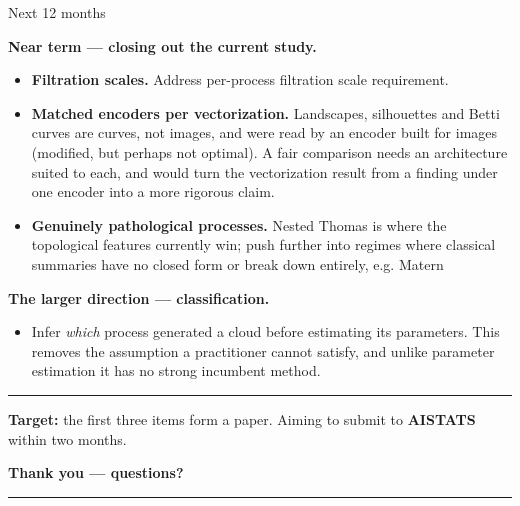 \documentclass[aspectratio=169,10pt]{beamer}
\begin{document}
\begin{frame}{Next 12 months}
\vspace{2pt}
{\footnotesize
\textbf{Near term --- closing out the current study.}
\begin{itemize}\setlength\itemsep{3pt}
  \item \textbf{Filtration scales.} Address per-process filtration scale requirement.
  \item \textbf{Matched encoders per vectorization.} Landscapes, silhouettes and
        Betti curves are curves, not images, and were read by an encoder built
        for images (modified, but perhaps not optimal). A fair comparison needs an architecture suited to each, and
        would turn the vectorization result from a finding under one encoder
        into a more rigorous claim.
  \item \textbf{Genuinely pathological processes.} Nested Thomas is where the
        topological features currently win; push further into regimes where
        classical summaries have no closed form or break down entirely, e.g. Matern
\end{itemize}
\vspace{5pt}
\textbf{The larger direction --- classification.}
\begin{itemize}\setlength\itemsep{3pt}
  \item Infer \emph{which} process generated a cloud before estimating its
        parameters. This removes the assumption a practitioner cannot satisfy,
        and unlike parameter estimation it has no strong incumbent method.
\end{itemize}}
\vspace{6pt}
\hrule
\vspace{4pt}
{\footnotesize
\textbf{Target:} the first three items form a paper. Aiming to submit to
\textbf{AISTATS} within two months.}
\end{frame}

\begin{frame}[plain]
\centering\vfill
{\Large\bfseries Thank you --- questions?}\\[0.35cm]
{\color{cred}\rule{4cm}{1.2pt}}
\vfill
\end{frame}

\appendix
\end{document}
